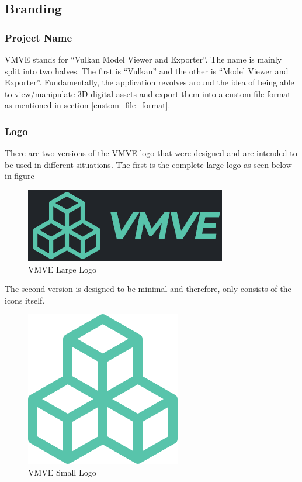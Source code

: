 \documentclass[11pt]{article}
\begin{document}
\subsection{Branding}


\subsubsection{Project Name}
VMVE stands for ``Vulkan Model Viewer and Exporter''. The name is mainly split
into two halves. The first is ``Vulkan'' and the other is ``Model Viewer and
Exporter''. Fundamentally, the application revolves around the idea of being able
to view/manipulate 3D digital assets and export them into a custom file format
as mentioned in section \ref{custom_file_format}.

\subsubsection{Logo}
There are two versions of the VMVE logo that were designed and are intended to
be used in different situations. The first is the complete large logo as seen
below in figure {}

\begin{figure}[h!]
  \centering
  \includegraphics{images/project_logo.png}
  \caption{VMVE Large Logo}
  \label{fig:project_logo_large}
\end{figure}

The second version is designed to be minimal and therefore, only consists of the
icons itself.

\begin{figure}[h!]
  \centering
  \includegraphics{images/project_icon.png}
  \caption{VMVE Small Logo}
  \label{fig:project_logo_small}
\end{figure}
\end{document}
